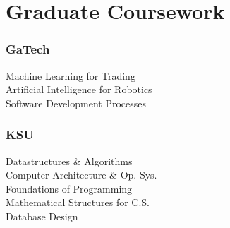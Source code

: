 %
%
%
%
\section{Graduate Coursework}
  \subsubsection{GaTech}
      {\small
      {\vspace{0.1em}}
      Machine Learning for Trading\\
      Artificial Intelligence for Robotics\\
      Software Development Processes\\
      }
  \subsubsection{KSU}
      {\small
      {\vspace{0.1em}}
      Datastructures \& Algorithms\\
      Computer Architecture \& Op. Sys.\\
      Foundations of Programming\\
      Mathematical Structures for C.S.\\
      Database Design\\
      }
%
%
%
{\vspace{1em}}
\profiles%
      {\web\Web}%
      {\github\Github}%
      {\linkedin\Linkedin}%